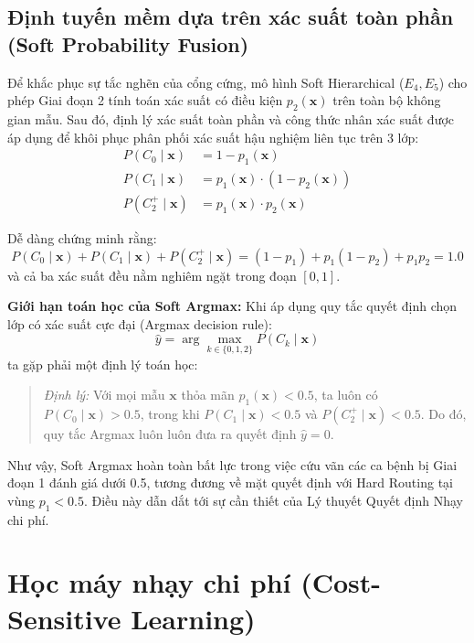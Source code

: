 \subsection{Định tuyến mềm dựa trên xác suất toàn phần (Soft Probability Fusion)}
Để khắc phục sự tắc nghẽn của cổng cứng, mô hình Soft Hierarchical ($E_4, E_5$) cho phép Giai đoạn 2 tính toán xác suất có điều kiện $p_2(\mathbf{x})$ trên toàn bộ không gian mẫu. Sau đó, định lý xác suất toàn phần và công thức nhân xác suất được áp dụng để khôi phục phân phối xác suất hậu nghiệm liên tục trên 3 lớp:
\begin{align}
    P(C_0 \mid \mathbf{x}) &= 1 - p_1(\mathbf{x}) \label{eq:soft-p0} \\
    P(C_1 \mid \mathbf{x}) &= p_1(\mathbf{x}) \cdot (1 - p_2(\mathbf{x})) \label{eq:soft-p1} \\
    P(C_2^+ \mid \mathbf{x}) &= p_1(\mathbf{x}) \cdot p_2(\mathbf{x}) \label{eq:soft-p2}
\end{align}

Dễ dàng chứng minh rằng:
\begin{equation}
    P(C_0 \mid \mathbf{x}) + P(C_1 \mid \mathbf{x}) + P(C_2^+ \mid \mathbf{x}) = (1 - p_1) + p_1(1 - p_2) + p_1 p_2 = 1.0
\end{equation}
và cả ba xác suất đều nằm nghiêm ngặt trong đoạn $[0, 1]$.

\textbf{Giới hạn toán học của Soft Argmax:} Khi áp dụng quy tắc quyết định chọn lớp có xác suất cực đại (Argmax decision rule):
\begin{equation}
    \hat{y} = \arg\max_{k \in \{0, 1, 2\}} P(C_k \mid \mathbf{x})
\end{equation}
ta gặp phải một định lý toán học:
\begin{quote}
\textit{Định lý:} Với mọi mẫu $\mathbf{x}$ thỏa mãn $p_1(\mathbf{x}) < 0.5$, ta luôn có $P(C_0 \mid \mathbf{x}) > 0.5$, trong khi $P(C_1 \mid \mathbf{x}) < 0.5$ và $P(C_2^+ \mid \mathbf{x}) < 0.5$. Do đó, quy tắc Argmax luôn luôn đưa ra quyết định $\hat{y} = 0$.
\end{quote}
Như vậy, Soft Argmax hoàn toàn bất lực trong việc cứu vãn các ca bệnh bị Giai đoạn 1 đánh giá dưới 0.5, tương đương về mặt quyết định với Hard Routing tại vùng $p_1 < 0.5$. Điều này dẫn dắt tới sự cần thiết của Lý thuyết Quyết định Nhạy chi phí.

\section{Học máy nhạy chi phí (Cost-Sensitive Learning)}
\label{sec:ly-thuyet-cost-sensitive}

